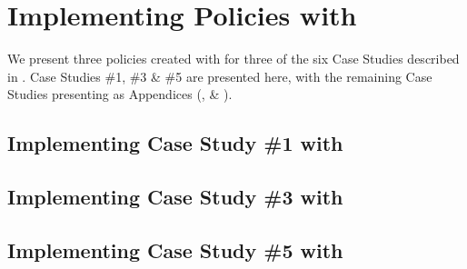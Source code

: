 \section{Implementing Policies with \thePolicyLang}
\label{sec:design_impl_pol_lang}

We present three policies created with \thePolicyLang for three of the six Case Studies described in . Case Studies \#1, \#3 \& \#5 are presented here, with the remaining Case Studies presenting as Appendices (,  \& ).

\subsection{Implementing Case Study \#1 with \thePolicyLang}
\label{subsec:design_impl_pol_1}



\subsection{Implementing Case Study \#3 with \thePolicyLang}
\label{subsec:design_impl_pol_3}



\subsection{Implementing Case Study \#5 with \thePolicyLang}
\label{subsec:design_impl_pol_5}


